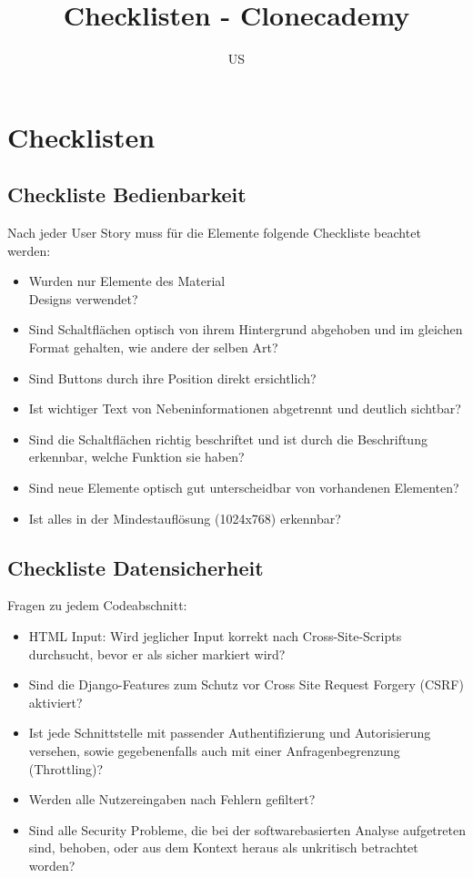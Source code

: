 \documentclass[accentcolor=tud0b,12pt,paper=a4]{tudexercise}
\title{Checklisten - Clonecademy}
\subtitle{US}
\begin{document}
	
	\maketitle
\section*{Checklisten}

\subsection*{Checkliste Bedienbarkeit}
Nach jeder User Story muss für die Elemente folgende Checkliste beachtet werden:
	\begin{itemize}
		
		\renewcommand{\labelitemi}{\scriptsize$\square$}
		\item Wurden nur Elemente des Material\\ Designs verwendet?
		\item Sind Schaltflächen optisch von ihrem Hintergrund abgehoben und im gleichen Format gehalten, wie andere der selben Art?
		\item Sind Buttons durch ihre Position direkt ersichtlich?
		\item Ist wichtiger Text von Nebeninformationen abgetrennt und deutlich sichtbar?
		\item Sind die Schaltflächen richtig beschriftet und ist durch die Beschriftung erkennbar, welche Funktion sie haben?
		\item Sind neue Elemente optisch gut unterscheidbar von vorhandenen Elementen?
		\item Ist alles in der Mindestauflösung (1024x768) erkennbar?
	\end{itemize}


\subsection*{Checkliste Datensicherheit}
Fragen zu jedem Codeabschnitt:

\begin{itemize}
	
	\renewcommand{\labelitemi}{\scriptsize$\square$}
	\renewcommand{\labelitemii}{\scriptsize$\square$}
    \item HTML Input: Wird jeglicher Input korrekt nach Cross-Site-Scripts durchsucht, bevor er als sicher markiert wird?
    \item Sind die Django-Features zum Schutz vor Cross Site Request Forgery (CSRF) aktiviert?
    \item Ist jede Schnittstelle mit passender Authentifizierung und Autorisierung versehen, sowie gegebenenfalls auch mit einer Anfragenbegrenzung (Throttling)?
    \item Werden alle Nutzereingaben nach Fehlern gefiltert?
    \item Sind alle Security Probleme, die bei der softwarebasierten Analyse aufgetreten sind, behoben, oder aus dem Kontext heraus als unkritisch betrachtet worden?
\end{itemize}
\end{document}
